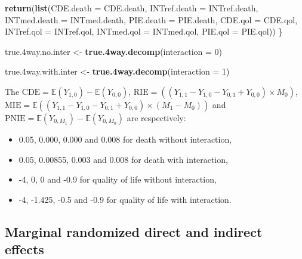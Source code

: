 \documentclass[
]{book}
\newenvironment{Shaded}{\begin{snugshade}}{\end{snugshade}}
\newcommand{\AttributeTok}[1]{\textcolor[rgb]{0.13,0.29,0.53}{#1}}
\newcommand{\DecValTok}[1]{\textcolor[rgb]{0.00,0.00,0.81}{#1}}
\newcommand{\FloatTok}[1]{\textcolor[rgb]{0.00,0.00,0.81}{#1}}
\newcommand{\FunctionTok}[1]{\textcolor[rgb]{0.13,0.29,0.53}{\textbf{#1}}}
\newcommand{\NormalTok}[1]{#1}
\newcommand{\OtherTok}[1]{\textcolor[rgb]{0.56,0.35,0.01}{#1}}
\providecommand{\tightlist}{%
  \setlength{\itemsep}{0pt}\setlength{\parskip}{0pt}}
\begin{document}
\begin{Shaded}
\begin{Highlighting}[]
  \FunctionTok{return}\NormalTok{(}\FunctionTok{list}\NormalTok{(}\AttributeTok{CDE.death =}\NormalTok{ CDE.death, }\AttributeTok{INTref.death =}\NormalTok{ INTref.death, }
              \AttributeTok{INTmed.death =}\NormalTok{ INTmed.death, }\AttributeTok{PIE.death =}\NormalTok{ PIE.death,}
              \AttributeTok{CDE.qol =}\NormalTok{ CDE.qol, }\AttributeTok{INTref.qol =}\NormalTok{ INTref.qol, }
              \AttributeTok{INTmed.qol =}\NormalTok{ INTmed.qol, }\AttributeTok{PIE.qol =}\NormalTok{ PIE.qol))}
\NormalTok{\}}
\end{Highlighting}
\end{Shaded}

\begin{Shaded}
\begin{Highlighting}[]
\NormalTok{true}\FloatTok{.4}\NormalTok{way.no.inter }\OtherTok{\textless{}{-}} \FunctionTok{true.4way.decomp}\NormalTok{(}\AttributeTok{interaction =} \DecValTok{0}\NormalTok{)}

\NormalTok{true}\FloatTok{.4}\NormalTok{way.with.inter }\OtherTok{\textless{}{-}} \FunctionTok{true.4way.decomp}\NormalTok{(}\AttributeTok{interaction =} \DecValTok{1}\NormalTok{)}
\end{Highlighting}
\end{Shaded}

The \(\text{CDE}=\mathbb{E}\left(Y_{1,0} \right) - \mathbb{E}\left(Y_{0,0}\right)\), \(\text{RIE}=\left((Y_{1,1} - Y_{1,0} - Y_{0,1} + Y_{0,0}) \times M_0\right)\), \(\text{MIE}= \mathbb{E}\left((Y_{1,1} - Y_{1,0} - Y_{0,1} + Y_{0,0}) \times (M_1 - M_0)\right)\) and \(\text{PNIE}=\mathbb{E}\left(Y_{0,M_1}\right) - \mathbb{E}\left(Y_{0,M_0}\right)\) are respectively:

\begin{itemize}
\tightlist
\item
  0.05, 0.000, 0.000 and 0.008 for death without interaction,
\item
  0.05, 0.00855, 0.003 and 0.008 for death with interaction,
\item
  -4, 0, 0 and -0.9 for quality of life without interaction,
\item
  -4, -1.425, -0.5 and -0.9 for quality of life with interaction.
\end{itemize}

\hypertarget{marginal-randomized-direct-and-indirect-effects}{%
\subsection{Marginal randomized direct and indirect effects}\label{marginal-randomized-direct-and-indirect-effects}}
\end{document}
